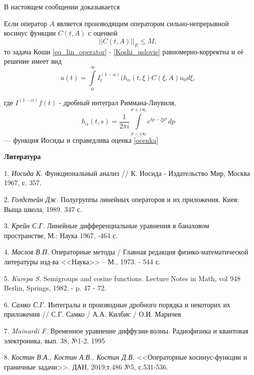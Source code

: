 В настоящем сообщении доказывается
	\begin{theorem}
		Если оператор $A$ является производящим оператором сильно-непрерывной косинус функции $C(t,A)$ с оценкой
		\begin{equation}
			||C(t,A)||_E \leq M,
		\end{equation}
		то задача Коши \ref{eq_lin_operator} - \ref{Koshi_uslovie} равномерно-корректна и её решение имеет вид
		\begin{equation}
			u(t) = \int\limits^{\infty}_0 I^{(1-\alpha)}_t (h_{\alpha}(t, \xi) C(\xi, A)u_0 d\xi,
		\end{equation}
	\end{theorem}
	где $I^{(1-\alpha)}f(t)$ - дробный интеграл Риммана-Лиувиля,
	$$
		h_\alpha(t,s) = \frac{1}{2\pi i} \int\limits^{\sigma + i\infty}_{\sigma - i \infty} e^{tp-\xi p^{\alpha}} dp
	$$ --- функция Иосиды
	и справедлива оценка \ref{ocenka}

\smallskip \centerline {\bf Литература} \nopagebreak

1. {\it Иосида К.} Функциональный анализ // К. Иосида - Издательство Мир, Москва 1967, с. 357.

2. {\it Голдстейн Дж.} Полугруппы линейных операторов и их приложения. Киев: Выща школа, 1989. 347 с.

3. {\it Крейн С.Г.} Линейные дифференциальные уравнения в банаховом пространстве, М.: Наука 1967. -464 с.

4. {\it Маслов В.П.} Операторные методы / Главная редакция физико-математической литературы изд-ва <<Наука>> -- М., 1973. - 544 с.

5. {\it Kurepa S.} Semigroups and cosine functions. Lecture Notes in Math, vol 948 Berlin, Springs, 1982. - p. 47 - 72.

6. {\it Самко С.Г.} Интегралы и производные дробного порядка и некоторих их приложения // С.Г. Самко / А.А. Килбис / О.И. Маричев

7. {\it Mainardi F.} Временное уравнение диффузии-волны. Радиофизика и квантовая электроника, вып. 38, №1-2, 1995

8. {\it Костин В.А., Костин А.В., Костин Д.В.} <<Операторные косинус-функции и граничные задачи>>. ДАН, 2019,т.486 №5, с.531-536.

